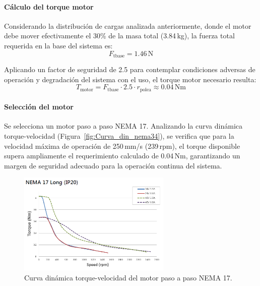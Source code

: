 \paragraph{Cálculo del torque motor}
Considerando la distribución de cargas analizada anteriormente, donde el motor debe mover efectivamente el 30\% de la masa total (3.84\,kg), la fuerza total requerida en la base del sistema es:
\begin{equation}
F_{\text{tbase}} = 1.46\,\text{N}
\end{equation}

Aplicando un factor de seguridad de 2.5 para contemplar condiciones adversas de operación y degradación del sistema con el uso, el torque motor necesario resulta:
\begin{equation}
T_{\text{motor}} = F_{\text{tbase}} \cdot 2.5 \cdot r_{\text{polea}} \approx 0.04\,\text{Nm}
\label{eq:torque_motor}
\end{equation}

\paragraph{Selección del motor}
Se selecciona un motor paso a paso NEMA 17. Analizando la curva dinámica torque-velocidad (Figura~\ref{fig:Curva_din_nema34}), se verifica que para la velocidad máxima de operación de 250\,mm/s (239\,rpm), el torque disponible supera ampliamente el requerimiento calculado de 0.04\,Nm, garantizando un margen de seguridad adecuado para la operación continua del sistema.

\begin{figure}[H]
    \centering
    \includegraphics[width=0.65\textwidth]{img/Nema17.png}
    \caption{Curva dinámica torque-velocidad del motor paso a paso NEMA 17.}
    \label{fig:Curva_din_nema17}
\end{figure}